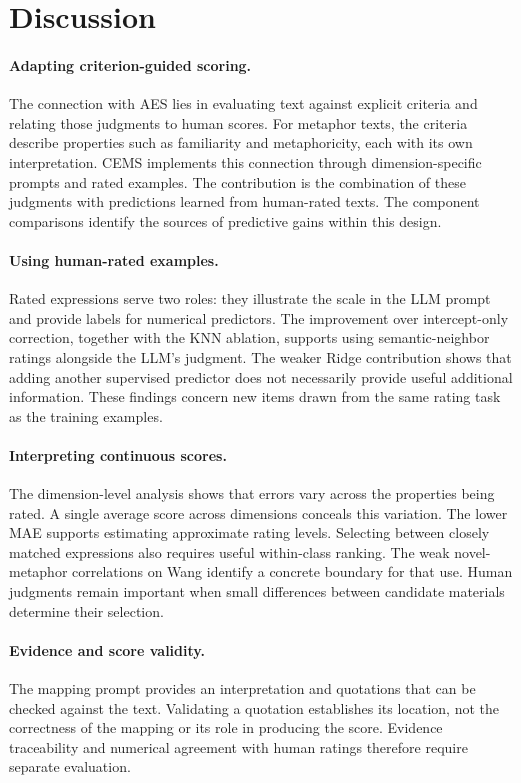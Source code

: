 \section{Discussion}

\paragraph{Adapting criterion-guided scoring.}
The connection with AES lies in evaluating text against explicit criteria and relating those judgments to human scores. For metaphor texts, the criteria describe properties such as familiarity and metaphoricity, each with its own interpretation. CEMS implements this connection through dimension-specific prompts and rated examples. The contribution is the combination of these judgments with predictions learned from human-rated texts. The component comparisons identify the sources of predictive gains within this design.

\paragraph{Using human-rated examples.}
Rated expressions serve two roles: they illustrate the scale in the LLM prompt and provide labels for numerical predictors. The improvement over intercept-only correction, together with the KNN ablation, supports using semantic-neighbor ratings alongside the LLM's judgment. The weaker Ridge contribution shows that adding another supervised predictor does not necessarily provide useful additional information. These findings concern new items drawn from the same rating task as the training examples.

\paragraph{Interpreting continuous scores.}
The dimension-level analysis shows that errors vary across the properties being rated. A single average score across dimensions conceals this variation. The lower MAE supports estimating approximate rating levels. Selecting between closely matched expressions also requires useful within-class ranking. The weak novel-metaphor correlations on Wang identify a concrete boundary for that use. Human judgments remain important when small differences between candidate materials determine their selection.

\paragraph{Evidence and score validity.}
The mapping prompt provides an interpretation and quotations that can be checked against the text. Validating a quotation establishes its location, not the correctness of the mapping or its role in producing the score. Evidence traceability and numerical agreement with human ratings therefore require separate evaluation.

